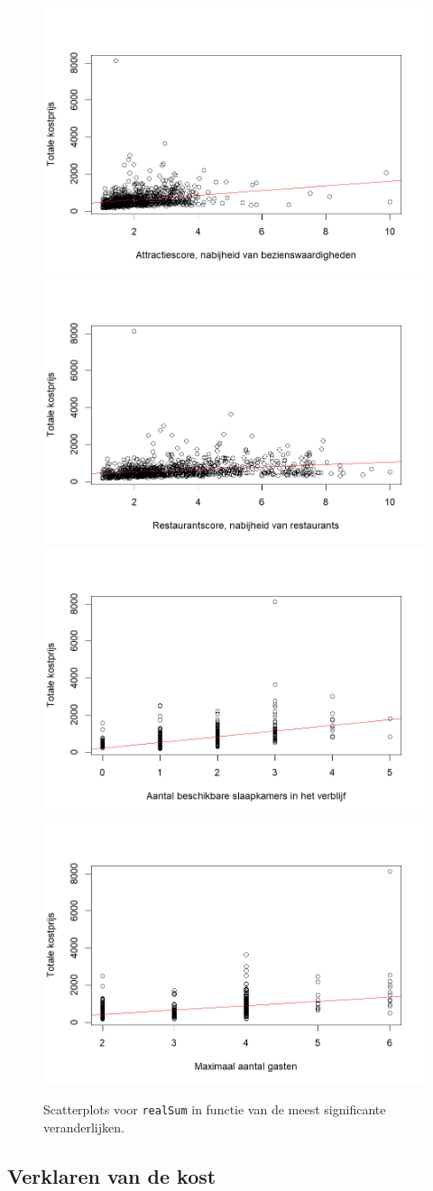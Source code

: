 \documentclass[a4paper]{kulakarticle}
\begin{document}
	\begin{figure}
		\centering
		\includegraphics[width=0.49\linewidth]{Figuren/correlatievanattr}
		\includegraphics[width=0.49\linewidth]{Figuren/correlatievanrest}
		\includegraphics[width=0.49\linewidth]{Figuren/correlatievanbedrooms}
		\includegraphics[width=0.49\linewidth]{Figuren/correlatievancapacity}
		\cprotect\caption{Scatterplots voor \verb*|realSum| in functie van de meest significante veranderlijken.}
		\label{fig:correlatievanattr}
	\end{figure}




	\subsection{Verklaren van de kost}
	
\end{document}
